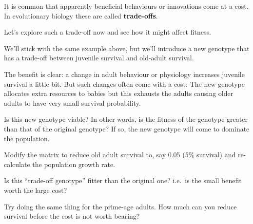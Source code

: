 \documentclass[
  a4paper]{book}
\begin{document}
It is common that apparently beneficial behaviours or innovations come at a cost. In evolutionary biology these are called \textbf{trade-offs}.

Let's explore such a trade-off now and see how it might affect fitness.

We'll stick with the same example above, but we'll introduce a new genotype that has a trade-off between juvenile survival and old-adult survival.

The benefit is clear: a change in adult behaviour or physiology increases juvenile survival a little bit.
But such changes often come with a cost: The new genotype allocates extra resources to babies but this exhausts the adults causing older adults to have very small survival probability.

Is this new genotype viable? In other words, is the fitness of the genotype greater than that of the original genotype? If so, the new genotype will come to dominate the population.

\begin{do-something}
Modify the matrix to reduce old adult survival to, say 0.05 (5\%
survival) and re-calculate the population growth rate.

Is this ``trade-off genotype'' fitter than the original one? i.e.~is the
small benefit worth the large cost?

Try doing the same thing for the prime-age adults. How much can you
reduce survival before the cost is not worth bearing?
\end{do-something}
\end{document}
